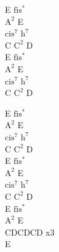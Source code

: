 \begin{chord}
    \hfill\break
    \hfill\break
    \hfill\break
    E $\mathrm{fis^*}$\\
    $\mathrm{A^2}$ E\\
    $\mathrm{cis^7}$ $\mathrm{h^7}$\\
    C $\mathrm{C^2}$ D\\
    E $\mathrm{fis^*}$\\
    $\mathrm{A^2}$ E\\
    $\mathrm{cis^7}$ $\mathrm{h^7}$\\
    C $\mathrm{C^2}$ D

    \hfill\break
    \hfill\break
    E $\mathrm{fis^*}$\\
    $\mathrm{A^2}$ E\\
    $\mathrm{cis^7}$ $\mathrm{h^7}$\\
    C $\mathrm{C^2}$ D\\
    E $\mathrm{fis^*}$\\
    $\mathrm{A^2}$ E\\
    $\mathrm{cis^7}$ $\mathrm{h^7}$\\
    C $\mathrm{C^2}$ D\\
    E $\mathrm{fis^*}$\\
    $\mathrm{A^2}$ E\\
    CDCDCD x3\\
    E
\end{chord}
